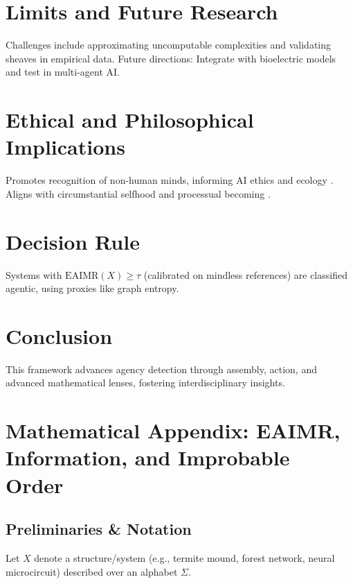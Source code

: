 \documentclass{article}
\begin{document}
\section{Limits and Future Research}
\label{sec:limits}

Challenges include approximating uncomputable complexities and validating sheaves in empirical data. Future directions: Integrate with bioelectric models \citep{levin2019} and test in multi-agent AI.

\section{Ethical and Philosophical Implications}
\label{sec:ethics}

Promotes recognition of non-human minds, informing AI ethics and ecology \citep{dennett1987}. Aligns with circumstantial selfhood \citep{ortega1961} and processual becoming \citep{whitehead1929, deleuze1987}.

\section{Decision Rule}
\label{sec:decision}

Systems with \(\text{EAIMR}(X) \geq \tau\) (calibrated on mindless references) are classified agentic, using proxies like graph entropy.

\section{Conclusion}
\label{sec:conclusion}

This framework advances agency detection through assembly, action, and advanced mathematical lenses, fostering interdisciplinary insights.

\appendix

\section{Mathematical Appendix: EAIMR, Information, and Improbable Order}
\label{app:math}

\subsection{Preliminaries \& Notation}

Let \(X\) denote a structure/system (e.g., termite mound, forest network, neural microcircuit) described over an alphabet \(\Sigma\).
\end{document}
